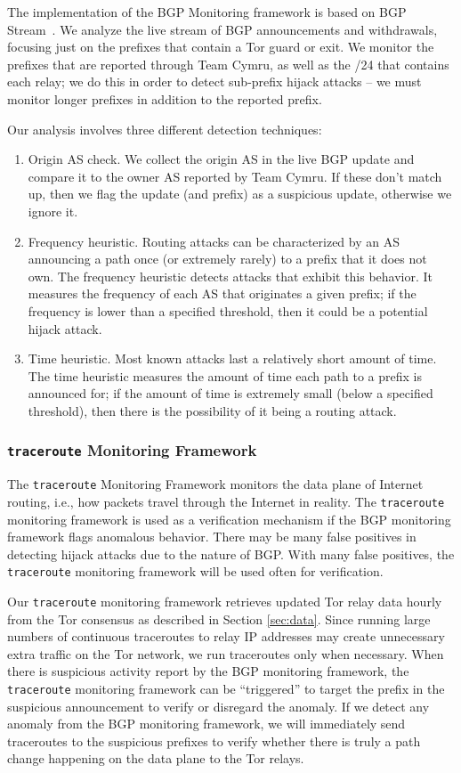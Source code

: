 The implementation of the BGP Monitoring framework is based on BGP Stream~\cite{bgpstream}.  We analyze the live stream of BGP announcements and withdrawals, focusing just on the prefixes that contain a Tor guard or exit.  We monitor the prefixes that are reported through Team Cymru, as well as the /24 that contains each relay; we do this in order to detect sub-prefix hijack attacks -- we must monitor longer prefixes in addition to the reported prefix.  

Our analysis involves three different detection techniques:

\begin{enumerate}
\item Origin AS check.  We collect the origin AS in the live BGP update and compare it to the owner AS reported by Team Cymru.  If these don't match up, then we flag the update (and prefix) as a suspicious update, otherwise we ignore it. 
\item Frequency heuristic.  Routing attacks can be 
characterized by an AS announcing a path once (or extremely rarely) to a prefix 
that it does not own.  The frequency heuristic detects attacks that exhibit this behavior. 
It measures the frequency of each AS that originates a given prefix; if the frequency is 
lower than a specified threshold, then it could be a potential hijack attack.
\item Time heuristic.  Most known attacks 
last a relatively short amount of time. The time heuristic measures the amount of time each 
path to a prefix is announced for; if the amount of time is extremely small (below a specified threshold), 
then there is the possibility of it being a routing attack. 
\end{enumerate}  

\subsubsection{{\tt traceroute} Monitoring Framework} 
The {\tt traceroute} Monitoring Framework monitors the data plane of Internet routing, i.e., how packets travel through the Internet in reality. The {\tt traceroute} monitoring framework is used as a verification mechanism if the BGP monitoring framework flags anomalous behavior. There may be many false positives in detecting hijack attacks due to the nature of BGP.  With many false positives, the {\tt traceroute} monitoring framework will be used often for verification.

Our {\tt traceroute} monitoring framework retrieves updated Tor relay data hourly from the Tor consensus as described in Section \ref{sec:data}. Since running large numbers of continuous traceroutes to relay IP addresses may create unnecessary extra traffic on the Tor network, we run traceroutes only when necessary.  When there is suspicious activity report by the BGP monitoring framework, the {\tt traceroute} monitoring framework can be ``triggered'' to target the prefix in the suspicious announcement to verify or disregard the anomaly. If we detect any anomaly from the BGP monitoring framework, we will immediately send traceroutes to the suspicious prefixes to verify whether there is truly a path change happening on the data plane to the Tor relays. 

